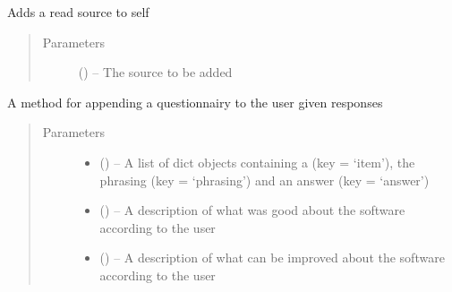 \documentclass[letterpaper,10pt,english]{sphinxmanual}
\begin{document}
\begin{fulllineitems}
\begin{fulllineitems}
\end{fulllineitems}


\begin{fulllineitems}
\label{\detokenize{user:user.User.add_source}}
Adds a read source to self
\begin{quote}\begin{description}
\item[{Parameters}] \leavevmode
{} (\href{https://docs.python.org/2/library/string.html\#module-string}{}) -- The source to be added

\end{description}\end{quote}

\end{fulllineitems}


\begin{fulllineitems}
\label{\detokenize{user:user.User.append_questionnaire}}
A method for appending a questionnairy to the user given responses
\begin{quote}\begin{description}
\item[{Parameters}] \leavevmode\begin{itemize}
\item {} 
 (\href{https://docs.python.org/2/library/functions.html\#list}{}\sphinxstyleliteralemphasis{(}\href{https://docs.python.org/2/library/stdtypes.html\#dict}{}\sphinxstyleliteralemphasis{)}\sphinxstyleliteralemphasis{}) -- A list of dict objects containing a  (key = `item'), the phrasing (key = `phrasing') and an answer (key = `answer')

\item {} 
 (\href{https://docs.python.org/2/library/string.html\#module-string}{}) -- A description of what was good about the software according to the user

\item {} 
 (\href{https://docs.python.org/2/library/string.html\#module-string}{}) -- A description of what can be improved about the software according to the user


\end{itemize}
\end{description}
\end{quote}
\end{fulllineitems}
\end{fulllineitems}
\end{document}
